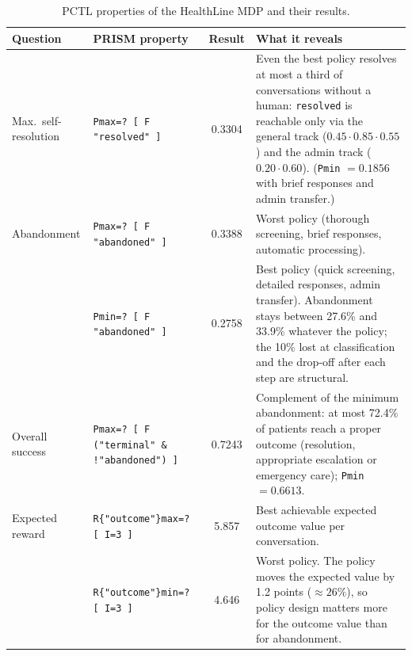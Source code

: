 \documentclass[10pt,a4paper]{article}
\newcommand{\code}[1]{\texttt{#1}}
\begin{document}
\begin{table}[t]
\centering\footnotesize
\caption{PCTL properties of the HealthLine MDP and their results.}
\label{tab:pctl}
\setlength{\tabcolsep}{4pt}
\begin{tabular}{>{\raggedright\arraybackslash}p{2.2cm}>{\raggedright\arraybackslash}p{5.0cm}c>{\raggedright\arraybackslash}p{7.6cm}}
\toprule
Question & PRISM property & Result & What it reveals\\
\midrule
Max.\ self-resolution & \code{Pmax=? [ F "resolved" ]} & 0.3304 & Even the best policy resolves at most a third of conversations without a human: \code{resolved} is reachable only via the general track ($0.45\cdot0.85\cdot0.55$) and the admin track ($0.20\cdot0.60$). (\code{Pmin} $=0.1856$ with brief responses and admin transfer.)\\
Abandonment & \code{Pmax=? [ F "abandoned" ]} & 0.3388 & Worst policy (thorough screening, brief responses, automatic processing).\\
 & \code{Pmin=? [ F "abandoned" ]} & 0.2758 & Best policy (quick screening, detailed responses, admin transfer). Abandonment stays between 27.6\% and 33.9\% whatever the policy; the 10\% lost at classification and the drop-off after each step are structural.\\
Overall success & \code{Pmax=? [ F ("terminal" \& !"abandoned") ]} & 0.7243 & Complement of the minimum abandonment: at most 72.4\% of patients reach a proper outcome (resolution, appropriate escalation or emergency care); \code{Pmin} $=0.6613$.\\
Expected reward & \code{R\{"outcome"\}max=? [ I=3 ]} & 5.857 & Best achievable expected outcome value per conversation.\\
 & \code{R\{"outcome"\}min=? [ I=3 ]} & 4.646 & Worst policy. The policy moves the expected value by 1.2 points ($\approx 26\%$), so policy design matters more for the outcome value than for abandonment.\\
\bottomrule
\end{tabular}
\end{table}
\end{document}
